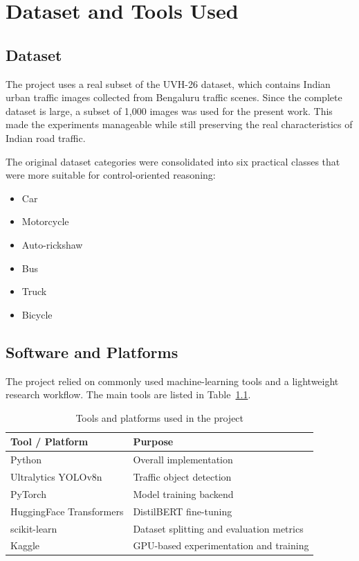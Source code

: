 \documentclass[12pt,a4paper]{report}
\begin{document}
\chapter{Dataset and Tools Used}
\section*{Dataset}
The project uses a real subset of the UVH-26 dataset, which contains Indian urban traffic images collected from Bengaluru traffic scenes. Since the complete dataset is large, a subset of 1,000 images was used for the present work. This made the experiments manageable while still preserving the real characteristics of Indian road traffic.

The original dataset categories were consolidated into six practical classes that were more suitable for control-oriented reasoning:
\begin{itemize}[leftmargin=1.5cm]
\item Car
\item Motorcycle
\item Auto-rickshaw
\item Bus
\item Truck
\item Bicycle
\end{itemize}

\section*{Software and Platforms}
The project relied on commonly used machine-learning tools and a lightweight research workflow. The main tools are listed in Table~\ref{tab:tools}.

\begin{table}[H]
\centering
\caption{Tools and platforms used in the project}
\label{tab:tools}
\begin{tabular}{>{\raggedright\arraybackslash}p{4cm} >{\raggedright\arraybackslash}p{8cm}}
\toprule
\textbf{Tool / Platform} & \textbf{Purpose} \\
\midrule
Python & Overall implementation \\
Ultralytics YOLOv8n & Traffic object detection \\
PyTorch & Model training backend \\
HuggingFace Transformers & DistilBERT fine-tuning \\
scikit-learn & Dataset splitting and evaluation metrics \\
Kaggle & GPU-based experimentation and training \\
\bottomrule
\end{tabular}
\end{table}
\end{document}
